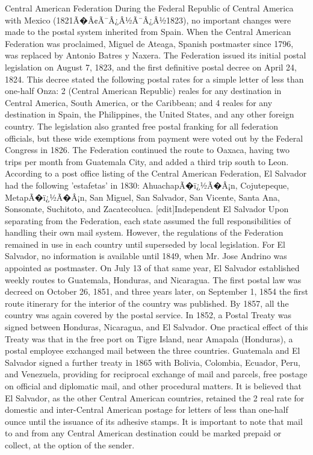 Central American Federation
During the Federal Republic of Central America with Mexico (1821Ã�Â¢Ã¯Â¿Â½Ã¯Â¿Â½1823), no important changes were made to the postal system inherited from Spain. When the Central American Federation was proclaimed, Miguel de Ateaga, Spanish postmaster since 1796, was replaced by Antonio Batres y Naxera. The Federation issued its initial postal legislation on August 7, 1823, and the first definitive postal decree on April 24, 1824. This decree stated the following postal rates for a simple letter of less than one-half Onza: 2 (Central American Republic) reales for any destination in Central America, South America, or the Caribbean; and 4 reales for any destination in Spain, the Philippines, the United States, and any other foreign country. The legislation also granted free postal franking for all federation officials, but these wide exemptions from payment were voted out by the Federal Congress in 1826. The Federation continued the route to Oaxaca, having two trips per month from Guatemala City, and added a third trip south to Leon. According to a post office listing of the Central American Federation, El Salvador had the following 'estafetas' in 1830: AhuachapÃ�ï¿½Ã�Â¡n, Cojutepeque, MetapÃ�ï¿½Ã�Â¡n, San Miguel, San Salvador, San Vicente, Santa Ana, Sonsonate, Suchitoto, and Zacatecoluca.
[edit]Independent El Salvador
Upon separating from the Federation, each state assumed the full responsibilities of handling their own mail system. However, the regulations of the Federation remained in use in each country until superseded by local legislation. For El Salvador, no information is available until 1849, when Mr. Jose Andrino was appointed as postmaster. On July 13 of that same year, El Salvador established weekly routes to Guatemala, Honduras, and Nicaragua. The first postal law was decreed on October 26, 1851, and three years later, on September 1, 1854 the first route itinerary for the interior of the country was published. By 1857, all the country was again covered by the postal service.
In 1852, a Postal Treaty was signed between Honduras, Nicaragua, and El Salvador. One practical effect of this Treaty was that in the free port on Tigre Island, near Amapala (Honduras), a postal employee exchanged mail between the three countries. Guatemala and El Salvador signed a further treaty in 1865 with Bolivia, Colombia, Ecuador, Peru, and Venezuela, providing for reciprocal exchange of mail and parcels, free postage on official and diplomatic mail, and other procedural matters. It is believed that El Salvador, as the other Central American countries, retained the 2 real rate for domestic and inter-Central American postage for letters of less than one-half ounce until the issuance of its adhesive stamps. It is important to note that mail to and from any Central American destination could be marked prepaid or collect, at the option of the sender.
